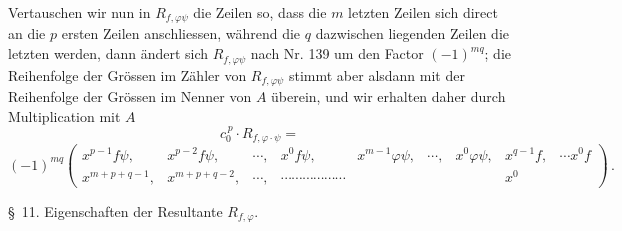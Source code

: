 \documentclass[11pt]{article}
\providecommand{\weberpage}[1]{}
\begin{document}
Vertauschen wir nun in $R_{f,\varphi\psi}$ die Zeilen so, dass die $m$
letzten Zeilen sich direct an die $p$ ersten Zeilen anschliessen,
w\"ahrend die $q$ dazwischen liegenden Zeilen die letzten werden, dann
\"andert sich $R_{f,\varphi\psi}$ nach Nr. 139 um den Factor $(-1)^{mq}$;
die Reihenfolge der Gr\"ossen im Z\"ahler von $R_{f,\varphi\psi}$
stimmt aber alsdann mit der Reihenfolge der Gr\"ossen im Nenner von
$A$ \"uberein, und wir erhalten daher durch Multiplication mit $A$
\[
c_0^{\,p} \cdot R_{f,\varphi\cdot\psi} =
\]
\[
(-1)^{mq}
\begin{pmatrix}
x^{p-1}f\psi, & x^{p-2}f\psi, & \cdots, & x^0f\psi, & x^{m-1}\varphi\psi, & \cdots, & x^0\varphi\psi, & x^{q-1}f, & \cdots x^0f \\
x^{m+p+q-1}, & x^{m+p+q-2}, & \cdots, & \cdots\cdots\cdots\cdots\cdots\cdots & & & & x^0
\end{pmatrix}\,.
\]


\weberpage{163}
\S\ 11. Eigenschaften der Resultante $R_{f,\varphi}$.
\end{document}
